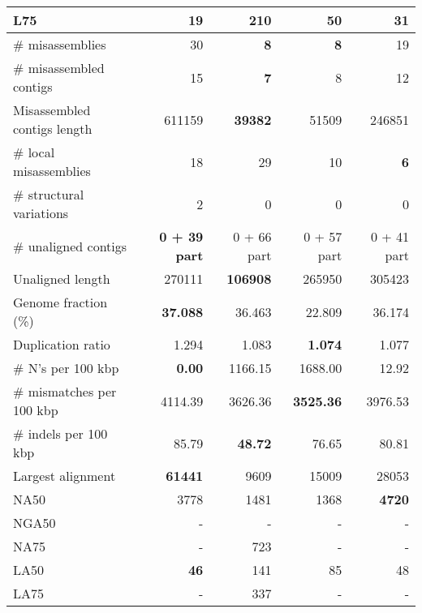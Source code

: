 \documentclass[12pt,a4paper]{article}
\begin{document}
\begin{table}[ht]
\begin{center}
\begin{tabular}{|l*{4}{|r}|}
L75 & {\bf 19} & 210 & 50 & 31 \\ \hline
\# misassemblies & 30 & {\bf 8} & {\bf 8} & 19 \\ \hline
\# misassembled contigs & 15 & {\bf 7} & 8 & 12 \\ \hline
Misassembled contigs length & 611159 & {\bf 39382} & 51509 & 246851 \\ \hline
\# local misassemblies & 18 & 29 & 10 & {\bf 6} \\ \hline
\# structural variations & 2 & 0 & 0 & 0 \\ \hline
\# unaligned contigs & {\bf 0 + 39 part} & 0 + 66 part & 0 + 57 part & 0 + 41 part \\ \hline
Unaligned length & 270111 & {\bf 106908} & 265950 & 305423 \\ \hline
Genome fraction (\%) & {\bf 37.088} & 36.463 & 22.809 & 36.174 \\ \hline
Duplication ratio & 1.294 & 1.083 & {\bf 1.074} & 1.077 \\ \hline
\# N's per 100 kbp & {\bf 0.00} & 1166.15 & 1688.00 & 12.92 \\ \hline
\# mismatches per 100 kbp & 4114.39 & 3626.36 & {\bf 3525.36} & 3976.53 \\ \hline
\# indels per 100 kbp & 85.79 & {\bf 48.72} & 76.65 & 80.81 \\ \hline
Largest alignment & {\bf 61441} & 9609 & 15009 & 28053 \\ \hline
NA50 & 3778 & 1481 & 1368 & {\bf 4720} \\ \hline
NGA50 & - & - & - & - \\ \hline
NA75 & - & 723 & - & - \\ \hline
LA50 & {\bf 46} & 141 & 85 & 48 \\ \hline
LA75 & - & 337 & - & - \\ \hline
\end{tabular}
\end{center}
\end{table}
\end{document}
